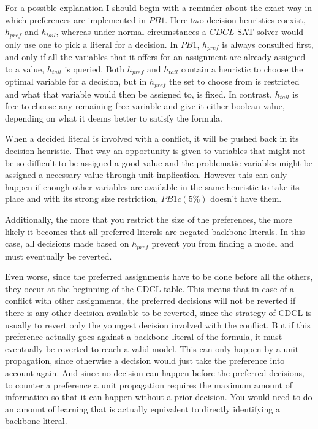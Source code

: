 
For a possible explanation I should begin with a reminder about the exact way in which preferences are implemented in $PB1$. Here two decision heuristics coexist, $h_{pref}$ and $h_{tail}$, whereas under normal circumstances a $CDCL$ SAT solver would only use one to pick a literal for a decision. In $PB1$, $h_{pref}$ is always consulted first, and only if all the variables that it offers for an assignment are already assigned to a value, $h_{tail}$ is queried. Both $h_{pref}$ and $h_{tail}$ contain a heuristic to choose the optimal variable for a decision, but in $h_{pref}$ the set to choose from is restricted and what that variable would then be assigned to, is fixed. In contrast, $h_{tail}$ is free to choose any remaining free variable and give it either boolean value, depending on what it deems better to satisfy the formula.

When a decided literal is involved with a conflict, it will be pushed back in its decision heuristic. That way an opportunity is given to variables that might not be so difficult to be assigned a good value and the problematic variables might be assigned a necessary value through unit implication. 
However this can only happen if enough other variables are available in the same heuristic to take its place and with its strong size restriction, $PB1c(5\%)$ doesn't have them.

Additionally, the more that you restrict the size of the preferences, the more likely it becomes that all preferred literals are negated backbone literals. In this case, all decisions made based on $h_{pref}$ prevent you from finding a model and must eventually be reverted.

Even worse, since the preferred assignments have to be done before all the others, they occur at the beginning of the CDCL table. This means that in case of a conflict with other assignments, the preferred decisions will not be reverted if there is any other decision available to be reverted, since the strategy of CDCL is usually to revert only the youngest decision involved with the conflict. But if this preference actually goes against a backbone literal of the formula, it must eventually be reverted to reach a valid model. This can only happen by a unit propagation, since otherwise a decision would just take the preference into account again. And since no decision can happen before the preferred decisions, to counter a preference a unit propagation requires the maximum amount of information so that it can happen without a prior decision. You would need to do an amount of learning that is actually equivalent to directly identifying a backbone literal. 

